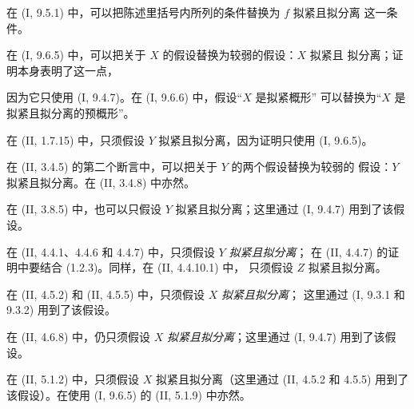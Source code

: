 \begin{env}[1.7.8]
\label{IV.1.7.8-fr}
在 (I, 9.5.1) 中，可以把陈述里括号内所列的条件替换为 $f$ 拟紧且拟分离
这一条件。
\end{env}

\begin{env}[1.7.9]
\label{IV.1.7.9-fr}
在 (I, 9.6.5) 中，可以把关于 $X$ 的假设替换为较弱的假设：$X$ 拟紧且
拟分离；证明本身表明了这一点，


因为它只使用 (I, 9.4.7)。在 (I, 9.6.6) 中，假设“$X$ 是拟紧概形”
可以替换为“$X$ 是拟紧且拟分离的预概形”。
\end{env}

\begin{env}[1.7.10]
\label{IV.1.7.10-fr}
在 (II, 1.7.15) 中，只须假设 $Y$ 拟紧且拟分离，因为证明只使用
(I, 9.6.5)。
\end{env}

\begin{env}[1.7.11]
\label{IV.1.7.11-fr}
在 (II, 3.4.5) 的第二个断言中，可以把关于 $Y$ 的两个假设替换为较弱的
假设：$Y$ 拟紧且拟分离。在 (II, 3.4.8) 中亦然。
\end{env}

\begin{env}[1.7.12]
\label{IV.1.7.12-fr}
在 (II, 3.8.5) 中，也可以只假设 $Y$ 拟紧且拟分离；这里通过
(I, 9.4.7) 用到了该假设。
\end{env}

\begin{env}[1.7.13]
\label{IV.1.7.13-fr}
在 (II, 4.4.1、4.4.6 和 4.4.7) 中，只须假设 $Y$ \emph{拟紧且拟分离}；
在 (II, 4.4.7) 的证明中要结合 (1.2.3)。同样，在 (II, 4.4.10.1) 中，
只须假设 $Z$ 拟紧且拟分离。
\end{env}

\begin{env}[1.7.14]
\label{IV.1.7.14-fr}
在 (II, 4.5.2) 和 (II, 4.5.5) 中，只须假设 $X$ \emph{拟紧且拟分离}；
这里通过 (I, 9.3.1 和 9.3.2) 用到了该假设。
\end{env}

\begin{env}[1.7.15]
\label{IV.1.7.15-fr}
在 (II, 4.6.8) 中，仍只须假设 $X$ \emph{拟紧且拟分离}；这里通过
(I, 9.4.7) 用到了该假设。
\end{env}

\begin{env}[1.7.16]
\label{IV.1.7.16-fr}
在 (II, 5.1.2) 中，只须假设 $X$ 拟紧且拟分离（这里通过
(II, 4.5.2 和 4.5.5) 用到了该假设）。在使用 (I, 9.6.5) 的
(II, 5.1.9) 中亦然。
\end{env}

